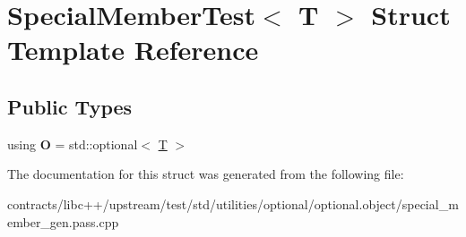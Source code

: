 \hypertarget{struct_special_member_test}{}\section{Special\+Member\+Test$<$ T $>$ Struct Template Reference}
\label{struct_special_member_test}
\subsection*{Public Types}
\begin{DoxyCompactItemize}
\item 
\mbox{\label{struct_special_member_test_ae3e1319ad225c0d59c18f9659e988b7b}} 
using {\bfseries O} = std\+::optional$<$ \mbox{\hyperlink{struct_t}{T}} $>$
\end{DoxyCompactItemize}


The documentation for this struct was generated from the following file\+:\begin{DoxyCompactItemize}
\item 
contracts/libc++/upstream/test/std/utilities/optional/optional.\+object/special\+\_\+member\+\_\+gen.\+pass.\+cpp\end{DoxyCompactItemize}
